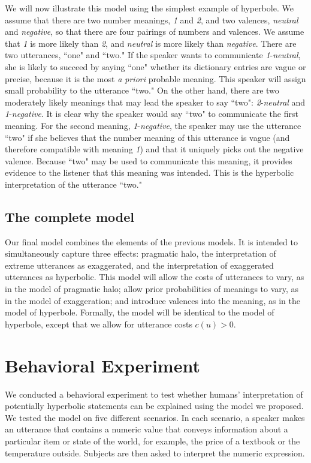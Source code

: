 \documentclass{article} %
\begin{document}
We will now illustrate this model using the simplest example of hyperbole. We assume that there are two number meanings, \emph{1} and \emph{2}, and two valences, \emph{neutral} and \emph{negative}, so that there are four pairings of numbers and valences. We assume that \emph{1} is more likely than \emph{2}, and \emph{neutral} is more likely than \emph{negative}. There are two utterances, ``one" and ``two." If the speaker wants to communicate \emph{1}-\emph{neutral}, she is likely to succeed by saying ``one" whether its dictionary entries are vague or precise, because it is the most \emph{a priori} probable meaning. This speaker will assign small probability to the utterance ``two." On the other hand, there are two moderately likely meanings that may lead the speaker to say ``two": \emph{2}-\emph{neutral} and \emph{1}-\emph{negative}. It is clear why the speaker would say ``two" to communicate the first meaning. For the second meaning, \emph{1}-\emph{negative}, the speaker may use the utterance ``two" if she believes that the number meaning of this utterance is vague (and therefore compatible with meaning \emph{1}) and that it uniquely picks out the negative valence. Because ``two" may be used to communicate this meaning, it provides evidence to the listener that this meaning was intended. This is the hyperbolic interpretation of the utterance ``two." 

\subsection{The complete model}

Our final model combines the elements of the previous models. It is intended to simultaneously capture three effects: pragmatic halo, the interpretation of extreme utterances as exaggerated, and the interpretation of exaggerated utterances as hyperbolic. This model will allow the costs of utterances to vary, as in the model of pragmatic halo; allow prior probabilities of meanings to vary, as in the model of exaggeration; and introduce valences into the meaning, as in the model of hyperbole. Formally, the model will be identical to the model of hyperbole, except that we allow for utterance costs $c(u) > 0$. 

\section{Behavioral Experiment}

We conducted a behavioral experiment to test whether humans' interpretation of potentially hyperbolic statements can be explained using the model we proposed. We tested the model on five different scenarios. In each scenario, a speaker makes an utterance that contains a numeric value that conveys information about a particular item or state of the world, for example, the price of a textbook or the temperature outside. Subjects are then asked to interpret the numeric expression.
\end{document}
